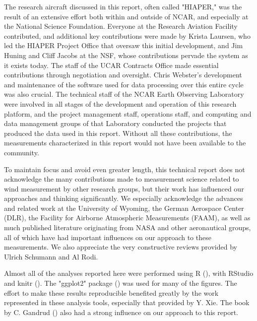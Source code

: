 \documentclass[12pt,twoside,english]{article}\usepackage[]{graphicx}\usepackage[]{color}
\begin{document}
The research aircraft discussed in this report, often called "HIAPER," was the result of an extensive effort both within and outside of NCAR, and especially at the National Science Foundation. Everyone at the Research Aviation Facility contributed, and additional key contributions were made by Krista Laursen, who led the HIAPER Project Office that oversaw this initial development, and Jim Huning and Cliff Jacobs at the NSF, whose contributions pervade the system as it exists today. The staff of the UCAR Contracts Office made essential contributions through negotiation and oversight. Chris Webster's development and maintenance of the software used for data processing over this entire cycle was also crucial. The technical staff of the NCAR Earth Observing Laboratory were involved in all stages of the development and operation of this research platform, and the project management staff, operations staff, and computing and data management groups of that Laboratory conducted the projects that produced the data used in this report. Without all these contributions, the measurements characterized in this report would not have been available to the community.

To maintain focus and avoid even greater length, this technical report does not acknowledge the many contributions made to measurement science related to wind measurement by other research groups, but their work has influenced our approaches and thinking significantly. We especially acknowledge the advances and related work at the University of Wyoming, the German Aerospace Center (DLR), the Facility for Airborne Atmospheric Measurements (FAAM), as well as much published literature originating from NASA and other aeronautical groups, all of which have had important influences on our approach to these measurements. We also appreciate the very constructive reviews provided by Ulrich Schumann and Al Rodi.

Almost all of the analyses reported here were performed using R (\citet{Rlanguage}), with RStudio  \citet{RStudio2012} and knitr (\citet{Xie2014a,Xie2014b}). The
"ggplot2" package (\citet{wickham2009}) was used for many of the figures. The effort to make these results reproducible benefited greatly by the work represented in these analysis tools, especially that provided by Y. Xie. The book by C. Gandrud (\citet{Gandrud2014}) also had a strong influence on our approach to this report.

\cleardoublepage
{}
\end{document}
